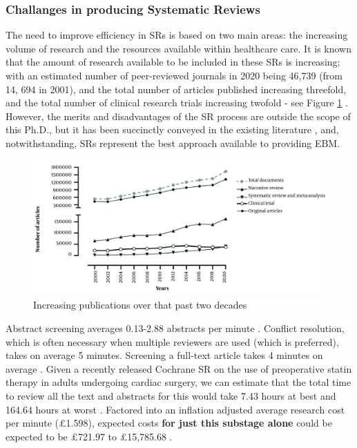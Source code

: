 \documentclass[10pt, english]{article}
\begin{document}


\subsubsection{Challanges in producing Systematic Reviews}

The need to improve efficiency in SRs is based on two main areas: the increasing volume of research and the resources available within healthcare care. It is known that the amount of research available to be included in these SRs is increasing; with an estimated number of peer-reviewed journals in 2020 being 46,739 (from 14, 694 in 2001), and the total number of articles published increasing threefold, and the total number of clinical research trials increasing twofold - see Figure \ref{fig:increasing_publications_over_time} \cite{ghasemi_scientific_2022}. However, the merits and disadvantages of the SR process are outside the scope of this Ph.D., but it has been succinctly conveyed in the existing literature \cite{howick_front_2011}, and, notwithstanding, SRs represent the best approach available to providing EBM.


\begin{figure}
    \centering
    \includegraphics[width=0.8\linewidth]{images/increase_in_publications.jpg}
    \caption{Increasing publications over that past two decades \cite{ghasemi_scientific_2022}}
    \label{fig:increasing_publications_over_time}
\end{figure}

Abstract screening averages 0.13-2.88 abstracts per minute \cite{shemilt_use_2016, giummarra_evaluation_2020, felizardo_visual_2013}. Conflict resolution, which is often necessary when multiple reviewers are used (which is preferred), takes on average 5 minutes. Screening a full-text article takes 4 minutes on average \cite{shemilt_use_2016}. Given a recently released Cochrane SR on the use of preoperative statin therapy in adults undergoing cardiac surgery, we can estimate that the total time to review all the text and abstracts for this would take 7.43 hours at best and 164.64 hours at worst \cite{antunes_preoperative_nodate}. Factored into an inflation adjusted average research cost per minute (£1.598), expected costs \textbf{for just this substage alone} could be expected to be £721.97 to £15,785.68 \cite{nussbaumer-streit_resource_2021}.
\end{document}

